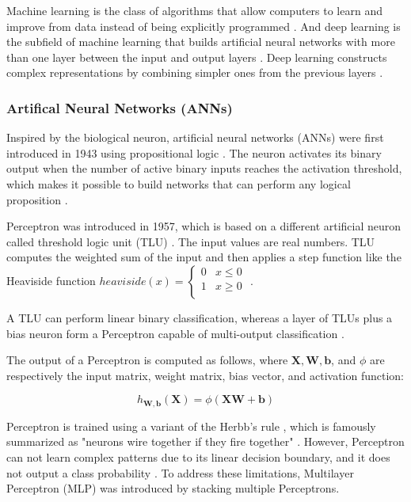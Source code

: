 \documentclass[a4paper, 11pt, oneside]{article}
\begin{document}
Machine learning is the class of algorithms that allow computers to learn and improve from data instead of being
explicitly programmed \cite{samuel1959some, geron2019hands}. And deep learning is the subfield of machine learning that
builds artificial neural networks with more than one layer between the input and output layers
\cite{geron2019hands, burkov2019hundred, zhang2018definition}. Deep learning constructs complex representations by
combining simpler ones from the previous layers \cite{goodfellow2016deep}.

\subsubsection{Artifical Neural Networks (ANNs)}

Inspired by the biological neuron, artificial neural networks (ANNs) were first introduced in 1943 using propositional
logic \cite{mcculloch1943logical}. The neuron activates its binary output when the number of active binary inputs reaches
the activation threshold, which makes it possible to build networks that can perform any logical proposition
\cite{geron2019hands, mcculloch1943logical}.

Perceptron was introduced in 1957, which is based on a different artificial neuron called threshold logic unit
(TLU) \cite{rosenblatt1957perceptron}. The input values are real numbers. TLU computes the weighted sum of the input
and then applies a step function like the Heaviside function
$heaviside (x) =
\begin{cases}
  0 & x \le 0 \\
  1 & x \geq 0 \\
\end{cases}$
\cite{geron2019hands, rosenblatt1957perceptron}.

A TLU can perform linear binary classification, whereas a layer of TLUs plus a bias neuron form a Perceptron capable of
multi-output classification \cite{geron2019hands}.

The output of a Perceptron is computed as follows, where $\mathbf{X}, \mathbf{W}, \mathbf{b}$, and $\phi$
are respectively the input matrix, weight matrix, bias vector, and activation function:

$$h_{\mathbf{W,b}}(\mathbf{X}) = \phi(\mathbf{XW} + \mathbf{b})$$

Perceptron is trained using a variant of the Herbb's rule \cite{hebb2005organization}, which is famously summarized
as "neurons wire together if they fire together" \cite{lowel1992selection}. However, Perceptron
can not learn complex patterns due to its linear decision boundary, and it does not output a class probability
\cite{geron2019hands}. To address these limitations, Multilayer Perceptron (MLP) was introduced by stacking multiple
Perceptrons.
\end{document}
